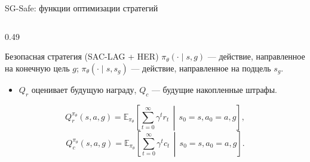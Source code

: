 \begin{frame}[shrink=10]{SG-Safe: функции оптимизации стратегий}
\begin{columns}[T,onlytextwidth]
\begin{column}{0.49\textwidth}
\begin{block}{Безопасная стратегия (SAC-LAG + HER)}
            \scriptsize
            \(\pi_\theta(\cdot\mid s,g)\) --- действие, направленное на
            конечную цель \(g\); \(\pi_\theta(\cdot\mid s,s_g)\) --- действие,
            направленное на подцель \(s_g\).

            \begin{itemize}
                \item \(Q_r\) оценивает будущую награду, \(Q_c\) ---
                      будущие накопленные штрафы.
            \end{itemize}

            \[
                Q_r^{\pi_\theta}(s,a,g)
                =
                \mathbb{E}_{\pi_\theta}\!\left[
                    \sum_{t=0}^{\infty}\gamma^t r_t
                    \,\middle|\,s_0=s,a_0=a,g
                \right],
            \]
            \[
                Q_c^{\pi_\theta}(s,a,g)
                =
                \mathbb{E}_{\pi_\theta}\!\left[
                    \sum_{t=0}^{\infty}\gamma^t c_t
                    \,\middle|\,s_0=s,a_0=a,g
                \right].
            \]
            \end{block}
        \end{column}
    \end{columns}

\end{frame}

